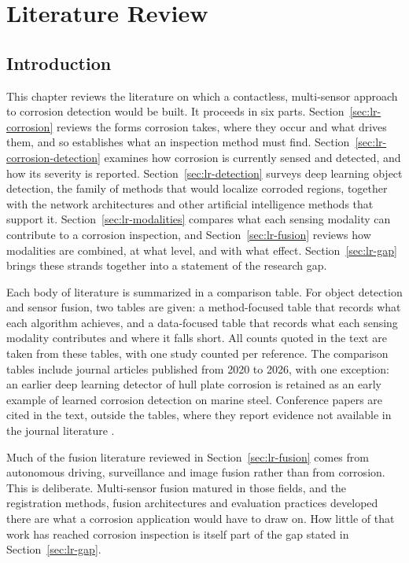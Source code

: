\providecommand{\cmY}{$\checkmark$}
\providecommand{\cmN}{$\times$}
\chapter[LITERATURE REVIEW]{Literature Review}
\label{ch:literature-review}

\section{Introduction}
\label{sec:lr-introduction}

This chapter reviews the literature on which a contactless, multi-sensor
approach to corrosion detection would be built. It proceeds in six parts.
Section~\ref{sec:lr-corrosion} reviews the forms corrosion takes, where they
occur and what drives them, and so establishes what an inspection method must
find. Section~\ref{sec:lr-corrosion-detection} examines how corrosion is
currently sensed and detected, and how its severity is reported.
Section~\ref{sec:lr-detection} surveys deep learning object detection, the
family of methods that would localize corroded regions, together with the
network architectures and other artificial intelligence methods that support it.
Section~\ref{sec:lr-modalities} compares what each sensing modality can
contribute to a corrosion inspection, and Section~\ref{sec:lr-fusion} reviews
how modalities are combined, at what level, and with what effect.
Section~\ref{sec:lr-gap} brings these strands together into a statement of the
research gap.

Each body of literature is summarized in a comparison table. For object
detection and sensor fusion, two tables are given: a method-focused table that
records what each algorithm achieves, and a data-focused table that records what
each sensing modality contributes and where it falls short. All counts quoted in the text are
taken from these tables, with one study counted per reference. The comparison
tables include journal articles published from 2020 to 2026, with one exception:
an earlier deep learning detector of hull plate corrosion \citep{Yao2019} is retained as
an early example of learned corrosion detection on marine steel. Conference papers are cited in the text, outside
the tables, where they report evidence not available in the journal literature
\citep{Soares2023,Ding2025,Zheng2025,Haitz2022,Mota2024}.

Much of the fusion literature reviewed in Section~\ref{sec:lr-fusion} comes from
autonomous driving, surveillance and image fusion rather than from corrosion.
This is deliberate. Multi-sensor fusion matured in those fields, and the
registration methods, fusion architectures and evaluation practices developed
there are what a corrosion application would have to draw on. How little of that
work has reached corrosion inspection is itself part of the gap stated in
Section~\ref{sec:lr-gap}.

